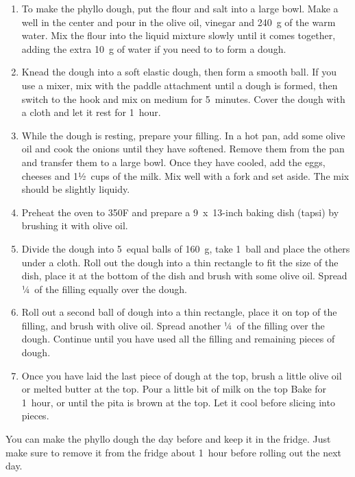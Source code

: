 \begin{enumerate}
    \item To make the phyllo dough, put the flour and salt into a large bowl. Make a well in the center and pour in the olive oil, vinegar and 240~g of the warm water. Mix the flour into the liquid mixture slowly until it comes together, adding the extra 10~g of water if you need to to form a dough.
    \item Knead the dough into a soft elastic dough, then form a smooth ball. If you use a mixer, mix with the paddle attachment until a dough is formed, then switch to the hook and mix on medium for 5~minutes. Cover the dough with a cloth and let it rest for 1~hour.
    \item While the dough is resting, prepare your filling. In a hot pan, add some olive oil and cook the onions until they have softened. Remove them from the pan and transfer them to a large bowl. Once they have cooled, add the eggs, cheeses and 1½~cups of the milk. Mix well with a fork and set aside. The mix should be slightly liquidy.
    \item Preheat the oven to 350\degree F and prepare a 9~x~13-inch baking dish (tapsi) by brushing it with olive oil.
    \item Divide the dough into 5~equal balls of 160~g, take 1~ball and place the others under a cloth. Roll out the dough into a thin rectangle to fit the size of the dish, place it at the bottom of the dish and brush with some olive oil. Spread ¼~of the filling equally over the dough.
    \item Roll out a second ball of dough into a thin rectangle, place it on top of the filling, and brush with olive oil. Spread another ¼~of the filling over the dough. Continue until you have used all the filling and remaining pieces of dough.
    \item Once you have laid the last piece of dough at the top, brush a little olive oil or melted butter at the top. Pour a little bit of milk on the top
    Bake for 1~hour, or until the pita is brown at the top. Let it cool before slicing into pieces.
\end{enumerate}

You can make the phyllo dough the day before and keep it in the fridge. Just make sure to remove it from the fridge about 1~hour before rolling out the next day.


